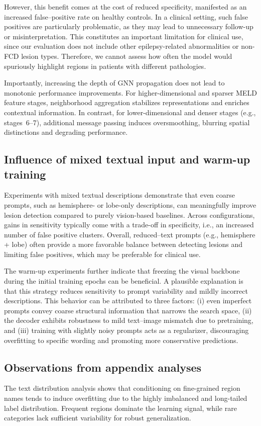 \documentclass[FCD_GNN.tex]{subfiles}
\begin{document}
However, this benefit comes at the cost of reduced specificity, manifested as an increased
false--positive rate on healthy controls. In a clinical setting, such false positives are
particularly problematic, as they may lead to unnecessary follow-up or misinterpretation.
This constitutes an important limitation for clinical use, since our evaluation does not
include other epilepsy-related abnormalities or non-FCD lesion types. Therefore, we cannot
assess how often the model would spuriously highlight regions in patients with different
pathologies.

Importantly, increasing the depth of GNN propagation does not lead to monotonic
performance improvements.
For higher-dimensional and sparser MELD feature stages, neighborhood aggregation
stabilizes representations and enriches contextual information.
In contrast, for lower-dimensional and denser stages (e.g., stages~6--7),
additional message passing induces oversmoothing, blurring spatial distinctions
and degrading performance.

\subsection*{Influence of mixed textual input and warm-up training}
Experiments with mixed textual descriptions demonstrate that even coarse prompts,
such as hemisphere- or lobe-only descriptions, can meaningfully improve lesion
detection compared to purely vision-based baselines.
Across configurations, gains in sensitivity typically come with a trade-off in specificity, i.e., an increased number of false positive clusters.
Overall, reduced--text prompts (e.g., hemisphere + lobe) often provide a more favorable balance between detecting lesions and limiting false positives, which may be preferable for clinical use.

The warm-up experiments further indicate that freezing the visual backbone during
the initial training epochs can be beneficial.
A plausible explanation is that this strategy reduces sensitivity to prompt
variability and mildly incorrect descriptions.
This behavior can be attributed to three factors: (i) even imperfect prompts
convey coarse structural information that narrows the search space, (ii) the
decoder exhibits robustness to mild text--image mismatch due to pretraining, and
(iii) training with slightly noisy prompts acts as a regularizer, discouraging
overfitting to specific wording and promoting more conservative predictions.

\subsection*{Observations from appendix analyses}
The text distribution analysis shows that conditioning on fine-grained region
names tends to induce overfitting due to the highly imbalanced and long-tailed
label distribution.
Frequent regions dominate the learning signal, while rare categories lack
sufficient variability for robust generalization.
\end{document}
